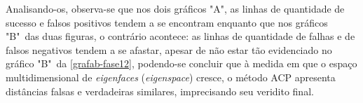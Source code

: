 Analisando-os, observa-se que nos dois gráficos "A", as linhas de quantidade de sucesso e falsos positivos tendem a se encontram enquanto que nos gráficos "B"\ das duas figuras, o contrário acontece: as linhas de quantidade de falhas e de falsos negativos tendem a se afastar, apesar de não estar tão evidenciado no gráfico "B"\ da \autoref{grafab-fase12}, podendo-se concluir que à medida em que o espaço multidimensional de \textit{eigenfaces} (\textit{eigenspace}) cresce, o método ACP apresenta distâncias falsas e verdadeiras similares, imprecisando seu veridito final.

























